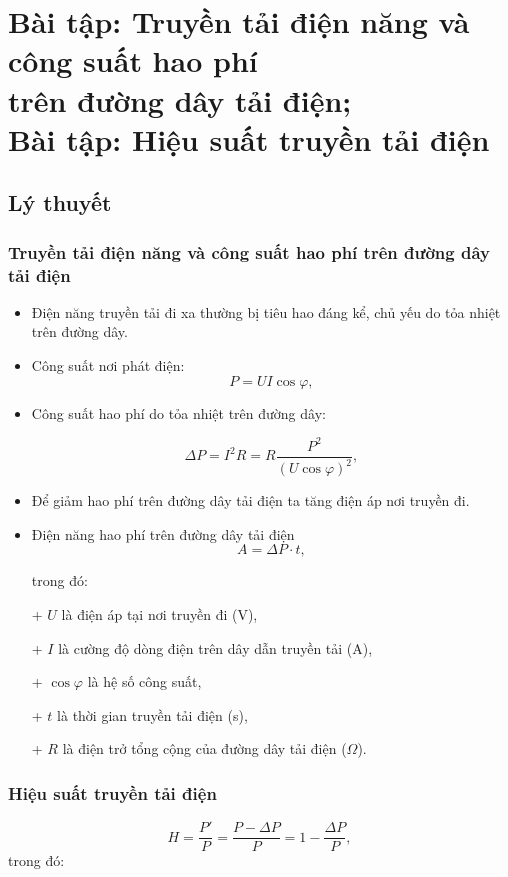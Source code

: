 
\chapter[Bài tập: Truyền tải điện năng và công suất hao phí trên đường dây tải điện;\\Bài tập: Hiệu suất truyền tải điện]{Bài tập: Truyền tải điện năng và công suất hao phí\\ trên đường dây tải điện;\\Bài tập: Hiệu suất truyền tải điện}
\section{Lý thuyết}
\subsection{Truyền tải điện năng và công suất hao phí trên đường dây tải điện}
\begin{itemize}
	\item Điện năng truyền tải đi xa thường bị tiêu hao đáng kể, chủ yếu do tỏa nhiệt trên đường dây.
	\item Công suất nơi phát điện:
	\begin{equation*}
		P=UI\cos \varphi,
	\end{equation*}
	\item Công suất hao phí do tỏa nhiệt trên đường dây:
	
	\begin{equation*}
		\Delta P = I^2R =R\dfrac{P^2}{(U \cos \varphi)^2},
	\end{equation*}
	
	\item Để giảm hao phí trên đường dây tải điện ta tăng điện áp nơi truyền đi.
	\item Điện năng hao phí trên đường dây tải điện 
	\begin{equation*}
		A=\Delta P \cdot t,
	\end{equation*}
	
	trong đó:
	
	
	+ $U$ là điện áp tại nơi truyền đi (V),
	
	+ $I$ là cường độ dòng điện trên dây dẫn truyền tải (A),
	
	+ $\cos \varphi$ là hệ số công suất,
	
	+ $t$ là thời gian truyền tải điện (s),
	
	+ $R$ là điện trở tổng cộng của đường dây tải điện ($\Omega$).
\end{itemize}
\subsection{Hiệu suất truyền tải điện}
	\begin{equation*}
		H=\dfrac{P'}{P}=\dfrac{P-\Delta P}{P}=1-\dfrac{\Delta P}{P},
	\end{equation*}
	trong đó:
	
